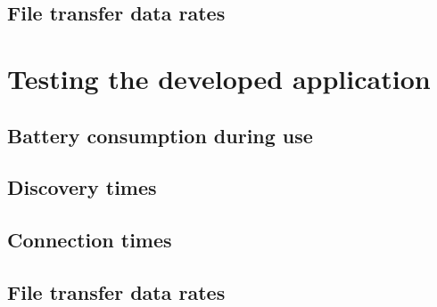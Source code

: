 \subsection{File transfer data rates}
\label{subsec:ftdr}

\section{Testing the developed application}

\subsection{Battery consumption during use}

\subsection{Discovery times}

\subsection{Connection times}

\subsection{File transfer data rates}




